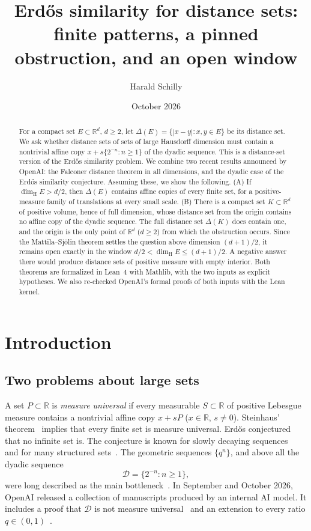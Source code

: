 \documentclass[11pt]{amsart}
\title[Erd\H{o}s similarity for distance sets]{Erd\H{o}s similarity for distance sets:\\
finite patterns, a pinned obstruction, and an open window}
\author{Harald Schilly}
\date{October 2026}
\theoremstyle{definition}
\theoremstyle{remark}
\newcommand{\R}{\mathbb{R}}
\newcommand{\dimH}{\dim_{\mathrm H}}
\newcommand{\Dy}{\mathcal{D}}
\begin{document}
\begin{abstract}
For a compact set $E\subset\R^d$, $d\ge2$, let $\Delta(E)=\{|x-y|:x,y\in E\}$ be its distance set.
We ask whether distance sets of sets of large Hausdorff dimension must contain a nontrivial
affine copy $x+s\{2^{-n}:n\ge1\}$ of the dyadic sequence. This is a distance-set version of
the Erd\H{o}s similarity problem. We combine two recent results announced by OpenAI: the Falconer
distance theorem in all dimensions, and the dyadic case of the Erd\H{o}s similarity conjecture.
Assuming these, we show the following. (A) If $\dimH E>d/2$, then $\Delta(E)$ contains affine
copies of every finite set, for a positive-measure family of translations at every small scale.
(B) There is a compact set $K\subset\R^d$ of positive volume, hence of full dimension, whose
distance set from the origin contains no affine copy of the dyadic sequence. The full distance
set $\Delta(K)$ does contain one, and the origin is the only point of $\R^d$ ($d\ge2$) from
which the obstruction occurs. Since the Mattila--Sj\"olin theorem settles the question above dimension
$(d+1)/2$, it remains open exactly in the window $d/2<\dimH E\le(d+1)/2$. A negative answer
there would produce distance sets of positive measure with empty interior. Both theorems are
formalized in Lean~4 with Mathlib, with the two inputs as explicit hypotheses. We also
re-checked OpenAI's formal proofs of both inputs with the Lean kernel.
\end{abstract}


\maketitle

\section{Introduction}

\subsection{Two problems about large sets}
A set $P\subset\R$ is \emph{measure universal} if every measurable $S\subset\R$ of positive
Lebesgue measure contains a nontrivial affine copy $x+sP$ ($x\in\R$, $s\neq0$). Steinhaus'
theorem~\cite{Steinhaus1920} implies that every finite set is measure universal. Erd\H{o}s
conjectured~\cite{Erdos1974} that no infinite set is. The conjecture is known for slowly
decaying sequences~\cite{Falconer1984} and for many structured sets~\cite{Bourgain1987,Kolountzakis1997}.
The geometric sequences $\{q^n\}$, and above all the dyadic sequence
\[
  \Dy=\{2^{-n}:n\ge1\},
\]
were long described as the main bottleneck~\cite{JungLaiMooroogen2024}. In September and October
2026, OpenAI released a collection of manuscripts produced by an internal AI model. It
includes a proof that $\Dy$ is not measure universal~\cite{OAIDyadic} and an extension to every
ratio $q\in(0,1)$~\cite{OAIGeometric}.
\end{document}
